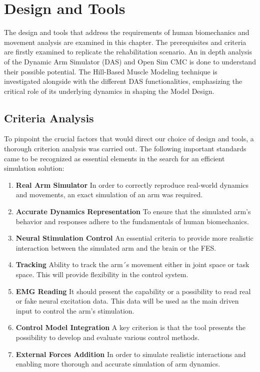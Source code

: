 \chapter{Design and Tools}
The design and tools that address the requirements of human biomechanics and movement analysis are examined in this chapter. The prerequisites and criteria are firstly examined to replicate the rehabilitation scenario. An in depth analysis of the Dynamic Arm Simulator (DAS) and Open Sim CMC is done to understand their possible potential. The Hill-Based Muscle Modeling technique is investigated alongside with the different DAS functionalities, emphasizing the critical role of its underlying dynamics in shaping the Model Design.

\section{Criteria Analysis}

To pinpoint the crucial factors that would direct our choice of design and tools, a thorough criterion analysis was carried out. The following important standards came to be recognized as essential elements in the search for an efficient simulation solution:

\begin{enumerate}
    \item \textbf{Real Arm Simulator} In order to correctly reproduce real-world dynamics and movements, an exact simulation of an arm was required.
    \item \textbf{Accurate Dynamics Representation} To ensure that the simulated arm's behavior and responses adhere to the fundamentals of human biomechanics.
    \item \textbf{Neural Stimulation Control} An essential criteria to provide more realistic interaction between the simulated arm and the brain or the FES.
    \item \textbf{Tracking} Ability to track the arm´s movement either in joint space or task space. This will provide flexibility in the control system.
    \item \textbf{EMG Reading} It should present the capability or a possibility to read real or fake neural excitation data. This data will be used as the main driven input to control the arm's stimulation.
    \item \textbf{Control Model Integration} A key criterion is that the tool presents the possibility to develop and evaluate various control methods.
    \item \textbf{External Forces Addition} In order to simulate realistic interactions and enabling more thorough and accurate simulation of arm dynamics.
    
\end{enumerate}




